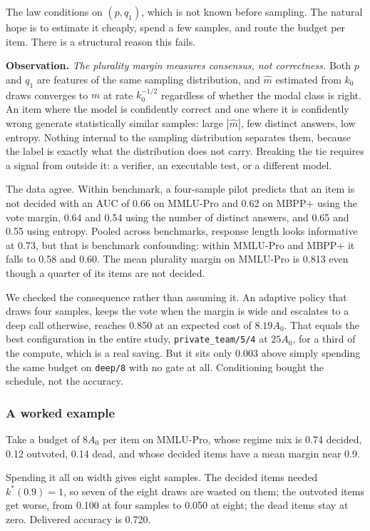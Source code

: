 \documentclass[11pt]{article}
\begin{document}
The law conditions on $(p, q_1)$, which is not known before sampling. The natural hope is to
estimate it cheaply, spend a few samples, and route the budget per item. There is a structural
reason this fails.

\textbf{Observation.} \emph{The plurality margin measures consensus, not correctness.} Both $p$ and
$q_1$ are features of the same sampling distribution, and $\hat{m}$ estimated from $k_0$ draws
converges to $m$ at rate $k_0^{-1/2}$ regardless of whether the modal class is right. An item where
the model is confidently correct and one where it is confidently wrong generate statistically
similar samples: large $|\hat{m}|$, few distinct answers, low entropy. Nothing internal to the
sampling distribution separates them, because the label is exactly what the distribution does not
carry. Breaking the tie requires a signal from outside it: a verifier, an executable test, or a
different model.

The data agree. Within benchmark, a four-sample pilot predicts that an item is not decided with an
AUC of 0.66 on MMLU-Pro and 0.62 on MBPP+ using the vote margin, 0.64 and 0.54 using the number of
distinct answers, and 0.65 and 0.55 using entropy. Pooled across benchmarks, response length looks
informative at 0.73, but that is benchmark confounding: within MMLU-Pro and MBPP+ it falls to 0.58
and 0.60. The mean plurality margin on MMLU-Pro is 0.813 even though a quarter of its items are not
decided.

We checked the consequence rather than assuming it. An adaptive policy that draws four samples,
keeps the vote when the margin is wide and escalates to a deep call otherwise, reaches 0.850 at an
expected cost of $8.19A_0$. That equals the best configuration in the entire study,
\texttt{private\_team/5/4} at $25A_0$, for a third of the compute, which is a real saving. But it
sits only 0.003 above simply spending the same budget on \texttt{deep/8} with no gate at all.
Conditioning bought the schedule, not the accuracy.

\subsubsection*{A worked example}

Take a budget of $8A_0$ per item on MMLU-Pro, whose regime mix is 0.74 decided, 0.12 outvoted, 0.14
dead, and whose decided items have a mean margin near 0.9.

Spending it all on width gives eight samples. The decided items needed $k^*(0.9) = 1$, so seven of
the eight draws are wasted on them; the outvoted items get worse, from 0.100 at four samples to
0.050 at eight; the dead items stay at zero. Delivered accuracy is 0.720.
\end{document}
